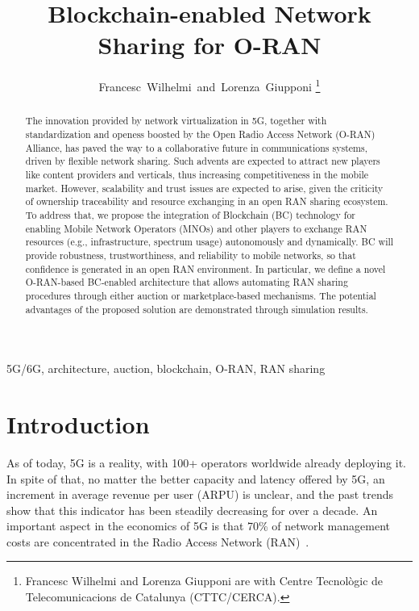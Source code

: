 \documentclass[journal]{IEEEtran}
\begin{document}
\title{Blockchain-enabled Network Sharing for O-RAN}

\author{Francesc~Wilhelmi~and~Lorenza~Giupponi%
\thanks{Francesc Wilhelmi and Lorenza Giupponi are with Centre Tecnol\`ogic de Telecomunicacions de Catalunya (CTTC/CERCA).}%
}

\maketitle

\begin{abstract}
The innovation provided by network virtualization in 5G, together with standardization and openess boosted by the Open Radio Access Network (O-RAN) Alliance, has paved the way to a collaborative future in communications systems, driven by flexible network sharing. Such advents are expected to attract new players like content providers and verticals, thus increasing competitiveness in the mobile market. However, scalability and trust issues are expected to arise, given the criticity of ownership traceability and resource exchanging in an open RAN sharing ecosystem. To address that, we propose the integration of Blockchain (BC) technology for enabling Mobile Network Operators (MNOs) and other players to exchange RAN resources (e.g., infrastructure, spectrum usage) autonomously and dynamically. BC will provide robustness, trustworthiness, and reliability to mobile networks, so that confidence is generated in an open RAN environment. In particular, we define a novel O-RAN-based BC-enabled architecture that allows automating RAN sharing procedures through either auction or marketplace-based mechanisms. The potential advantages of the proposed solution are demonstrated through simulation results. 
\end{abstract}

\begin{IEEEkeywords}
5G/6G, architecture, auction, blockchain, O-RAN, RAN sharing
\end{IEEEkeywords}

\IEEEpeerreviewmaketitle

\section{Introduction}

As of today, 5G is a reality, with 100+ operators worldwide already deploying it. In spite of that, no matter the better capacity and latency offered by 5G, an increment in average revenue per user (ARPU) is unclear, and the past trends show that this indicator has been steadily decreasing for over a decade. An important aspect in the economics of 5G is that 70\% of network management costs are concentrated in the Radio Access Network (RAN)~\cite{ORAN2}. 
\end{document}
